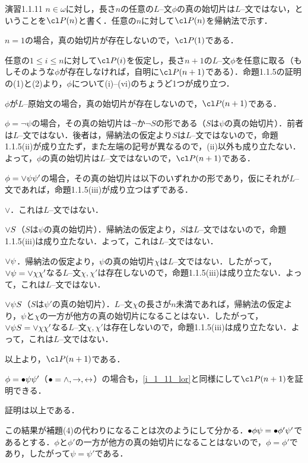 \begin{excfield}{演習1.1.11}
  $n \in \omega$に対し，長さ$n$の任意の$L$--文$\phi$の真の始切片は$L$--文ではない，ということを$\cl P (n)$と書く．任意の$n$に対して$\cl P (n)$を帰納法で示す．
  \begin{step}
    \item $n = 1$の場合，真の始切片が存在しないので，$\cl P (1)$である．
  \end{step}
  任意の$1 \le i \le n$に対して$\cl P (i)$を仮定し，長さ$n + 1$の$L$--文$\phi$を任意に取る（もしそのような$\phi$が存在しなければ，自明に$\cl P (n + 1)$である）．命題1.1.5の証明の(1)と(2)より，$\phi$について(i)--(vi)のちょうど1つが成り立つ．
  \begin{step}[resume]
    \item $\phi$が$L$--原始文の場合，真の始切片が存在しないので，$\cl P (n + 1)$である．
    \item $\phi = \lnot \psi$の場合，その真の始切片は$\lnot$か$\lnot S$の形である（$S$は$\psi$の真の始切片）．前者は$L$--文ではない．後者は，帰納法の仮定より$S$は$L$--文ではないので，命題1.1.5(ii)が成り立たず，また左端の記号が異なるので，(ii)以外も成り立たない．よって，$\phi$の真の始切片は$L$--文ではないので，$\cl P (n + 1)$である．
    \item \label{i_1_11_lor}
    $\phi = \mathord{\lor} \psi \psi'$の場合，その真の始切片は以下のいずれかの形であり，仮にそれが$L$--文であれば，命題1.1.5(iii)が成り立つはずである．
    \begin{step}
      \item $\lor$．これは$L$--文ではない．
      \item $\mathord{\lor} S$（$S$は$\psi$の真の始切片）．帰納法の仮定より，$S$は$L$--文ではないので，命題1.1.5(iii)は成り立たない．よって，これは$L$--文ではない．
      \item $\mathord{\lor} \psi$．帰納法の仮定より，$\psi$の真の始切片$\chi$は$L$--文ではない．したがって，$\mathord{\lor} \psi = \mathord{\lor} \chi \chi'$なる$L$--文$\chi, \chi'$は存在しないので，命題1.1.5(iii)は成り立たない．よって，これは$L$--文ではない．
      \item $\mathord{\lor} \psi S$（$S$は$\psi'$の真の始切片）．$L$--文$\chi$の長さが$n$未満であれば，帰納法の仮定より，$\psi$と$\chi$の一方が他方の真の始切片になることはない．したがって，$\mathord{\lor} \psi S = \mathord{\lor} \chi \chi'$なる$L$--文$\chi, \chi'$は存在しないので，命題1.1.5(iii)は成り立たない．よって，これは$L$--文ではない．
    \end{step}
    以上より，$\cl P (n + 1)$である．
    \item $\phi = \mathord{\bullet} \psi \psi'$（$\bullet = \mathord{\land}, \mathord{\rightarrow}, \mathord{\leftrightarrow}$）の場合も，\ref{i_1_11_lor}と同様にして$\cl P (n + 1)$を証明できる．
  \end{step}
  証明は以上である．

  この結果が補題(4)の代わりになることは次のようにして分かる．$\mathord{\bullet} \phi \psi = \mathord{\bullet} \phi' \psi'$であるとする．$\phi$と$\phi'$の一方が他方の真の始切片になることはないので，$\phi = \phi'$であり，したがって$\psi = \psi'$である．
\end{excfield}



